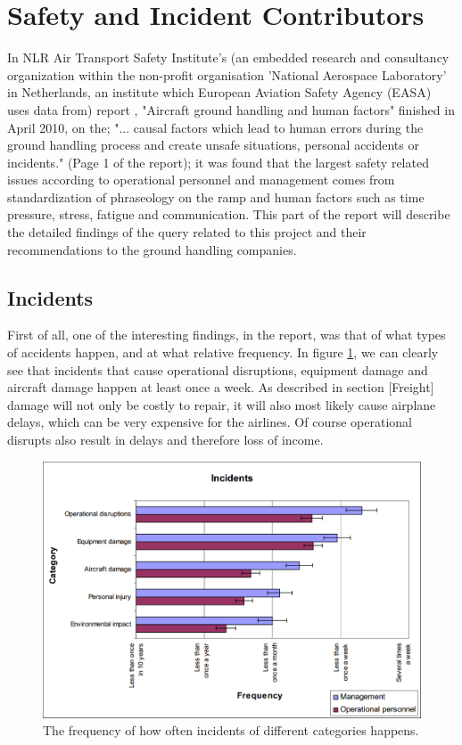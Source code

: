 \section{Safety and Incident Contributors}
In NLR Air Transport Safety Institute's (an embedded research and consultancy organization within the non-profit organisation 'National Aerospace Laboratory' in Netherlands, an institute which European Aviation Safety Agency (EASA) uses data from) report \cite{NLR_human_factors}, "Aircraft ground handling and human factors" finished in April 2010, on the; "... causal factors which lead to human errors during the ground handling process and create unsafe situations, personal accidents or incidents." (Page 1 of the report); it was found that the largest safety related issues according to operational personnel and management comes from standardization of phraseology on the ramp and human factors such as time pressure, stress, fatigue and communication. This part of the report will describe the detailed findings of the query related to this project and their recommendations to the ground handling companies.

\subsection{Incidents}
First of all, one of the interesting findings, in the report, was that of what types of accidents happen, and at what relative frequency. In figure \ref{FrequencyOfIncidents}, we can clearly see that incidents that cause operational disruptions, equipment damage and aircraft damage happen at least once a week. As described in section [Freight] damage will not only be costly to repair, it will also most likely cause airplane delays, which can be very expensive for the airlines. Of course operational disrupts also result in delays and therefore loss of income.

\begin{figure}[H]
\centering
\includegraphics[width=\textwidth]{Grafik/FrequencyOfIncidents}
\caption{The frequency of how often incidents of different categories happens.}
\label{FrequencyOfIncidents}
\end{figure}

